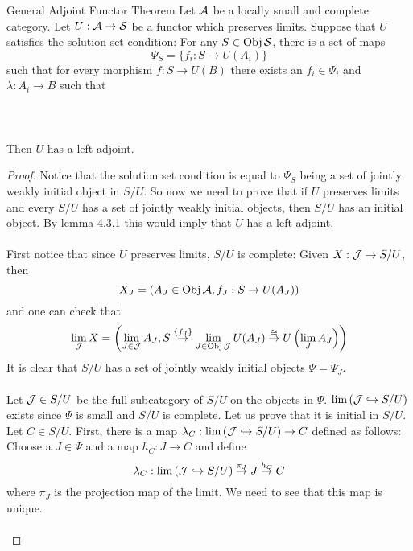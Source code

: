 \documentclass[a4paper]{article}
\begin{document}
\begin{thm}{General Adjoint Functor Theorem}{} Let $\mathcal{A}$ be a locally small and complete category. Let $U:\mathcal{A}\to\mathcal{S}$ be a functor which preserves limits. Suppose that $U$ satisfies the solution set condition: For any $S\in\operatorname{Obj}\mathcal{S}$, there is a set of maps $$\Psi_S=\{f_i:S\to U(A_i)\}$$ such that for every morphism $f:S\to U(B)$ there exists an $f_i\in\Psi_i$ and $\lambda:A_i\to B$ such that \\~\\
\\~\\
Then $U$ has a left adjoint. \tcbline
\begin{proof}
Notice that the solution set condition is equal to $\Psi_S$ being a set of jointly weakly initial object in $S/U$. So now we need to prove that if $U$ preserves limits and every $S/U$ has a set of jointly weakly initial objects, then $S/U$ has an initial object. By lemma 4.3.1 this would imply that $U$ has a left adjoint. \\~\\

First notice that since $U$ preserves limits, $S/U$ is complete: Given $X:\mathcal{J}\to S/U$, then $$X_J=\left(A_J\in\operatorname{Obj}\mathcal{A},f_J:S\to U(A_J)\right)$$ and one can check that $$\lim_{\mathcal{J}} X=\left(\lim_{J\in\mathcal{J}}A_J,S\overset{\{f_J\}}{\to}\lim_{J\in\operatorname{Obj}\mathcal{J}}U(A_J)\overset{\cong}{\to}U\left(\lim_JA_J\right)\right)$$ It is clear that $S/U$ has a set of jointly weakly initial objects $\Psi=\Psi_J$. \\~\\

Let $\mathcal{J}\in S/U$ be the full subcategory of $S/U$ on the objects in $\Psi$. $\lim\left(\mathcal{J}\hookrightarrow S/U\right)$ exists since $\Psi$ is small and $S/U$ is complete. Let us prove that it is initial in $S/U$. Let $C\in S/U$. First, there is a map $\lambda_C:\lim\left(\mathcal{J}\hookrightarrow S/U\right)\to C$ defined as follows: Choose a $J\in\Psi$ and a map $h_C:J\to C$ and define $$\lambda_C:\lim\left(\mathcal{J}\hookrightarrow S/U\right)\overset{\pi_J}{\to}J\overset{h_C}{\to}C$$ where $\pi_J$ is the projection map of the limit. We need to see that this map is unique. \\~\\


\end{proof}
\end{thm}
\end{document}
